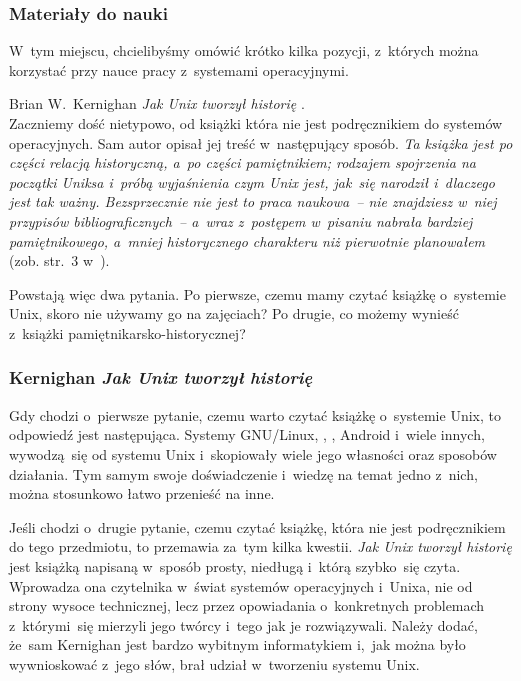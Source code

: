 \documentclass[10pt,t]{beamer}
\begin{document}
\begin{frame}
  \frametitle{Materiały do nauki}


  W~tym miejscu, chcielibyśmy omówić krótko kilka pozycji, z~których można
  korzystać przy nauce pracy z~systemami operacyjnymi.

  Brian W.~Kernighan \textit{Jak Unix tworzył historię}
  \parencite{Kernighan-Jak-Unix-tworzyl-historie-Pub-2021}. \\
  Zaczniemy dość nietypowo, od książki która nie jest podręcznikiem
  do systemów operacyjnych. Sam autor opisał jej treść w~następujący
  sposób. \textit{Ta książka jest po części relacją historyczną, a~po
    części pamiętnikiem; rodzajem spojrzenia na początki Uniksa i~próbą
    wyjaśnienia czym Unix jest, jak~się narodził i~dlaczego jest tak ważny.
    Bezsprzecznie nie jest to praca naukowa~-- nie znajdziesz w~niej
    przypisów bibliograficznych~-- a~wraz z~postępem w~pisaniu nabrała
    bardziej pamiętnikowego, a~mniej historycznego charakteru niż
    pierwotnie planowałem} (zob. str.~$3$
  w~\parencite{Kernighan-Jak-Unix-tworzyl-historie-Pub-2021}).

  Powstają więc dwa pytania. Po pierwsze, czemu mamy czytać książkę
  o~systemie Unix, skoro nie używamy go na zajęciach? Po drugie, co możemy
  wynieść z~książki pamiętnikarsko-historycznej?

\end{frame}





\begin{frame}
  \frametitle{Kernighan \textit{Jak Unix tworzył historię}}


  Gdy chodzi o~pierwsze pytanie, czemu warto czytać książkę o~systemie Unix,
  to odpowiedź jest następująca. Systemy GNU/Linux,
  ,
  ,
  {Android} i~wiele innych, wywodzą~się od systemu Unix i~skopiowały
  wiele jego własności oraz sposobów działania. Tym samym swoje
  doświadczenie i~wiedzę na temat jedno z~nich, można stosunkowo łatwo
  przenieść na inne.

  Jeśli chodzi o~drugie pytanie, czemu czytać książkę, która nie jest
  podręcznikiem do tego przedmiotu, to przemawia za~tym kilka kwestii.
  \textit{Jak Unix tworzył historię} jest książką napisaną w~sposób prosty,
  niedługą i~którą szybko~się czyta. Wprowadza ona czytelnika w~świat
  systemów operacyjnych i~Unixa, nie od strony wysoce technicznej, lecz
  przez opowiadania o~konkretnych problemach z~którymi~się mierzyli
  jego twórcy i~tego jak je rozwiązywali. Należy dodać, że~sam Kernighan
  jest bardzo wybitnym informatykiem i,~jak można było wywnioskować z~jego
  słów, brał udział w~tworzeniu systemu Unix.

\end{frame}
\end{document}
